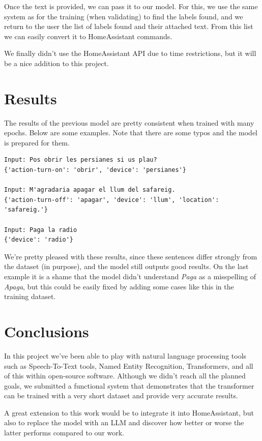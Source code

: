 \documentclass{article}
\begin{document}
Once the text is provided, we can pass it to our model. For this, we use the same system as for the training (when validating) to find the labels found, and we return to the user the list of labels found and their attached text. From this list we can easily convert it to HomeAssistant commands.

We finally didn't use the HomeAssistant API due to time restrictions, but it will be a nice addition to this project.

\section{Results}

The results of the previous model are pretty consistent when trained with many epochs.
Below are some examples. Note that there are some typos and the model is prepared for them.

\begin{verbatim}
Input: Pos obrir les persianes si us plau?
{'action-turn-on': 'obrir', 'device': 'persianes'}

Input: M'agradaria apagar el llum del safareig.
{'action-turn-off': 'apagar', 'device': 'llum', 'location': 'safareig.'}

Input: Paga la radio
{'device': 'radio'}
\end{verbatim}

We're pretty pleased with these results, since these sentences differ strongly from the dataset (in purpose), and the model still outputs good results. On the last example it is a shame that the model didn't understand \textit{Paga} as a misspelling of \textit{Apaga}, but this could be easily fixed by adding some cases like this in the training dataset.

\section{Conclusions}

In this project we've been able to play with natural language processing tools such as Speech-To-Text tools, Named Entity Recognition, Transformers, and all of this within open-source software. Although we didn't reach all the planned goals, we submitted a functional system that demonstrates that the transformer can be trained with a very short dataset and provide very accurate results.

A great extension to this work would be to integrate it into HomeAssistant, but also to replace the model with an LLM and discover how better or worse the latter performs compared to our work.

% 


\end{document}
